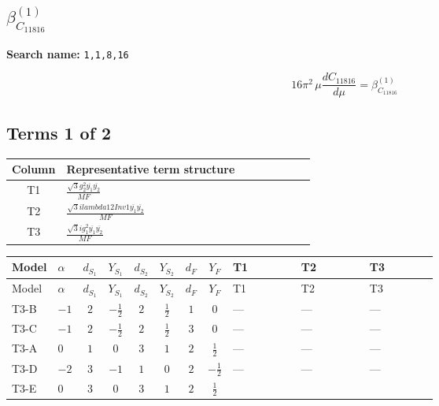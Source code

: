 \documentclass[8pt]{article}
\begin{document}
\begin{landscape}
\section*{$\beta_{C_{11816}}^{(1)}$}
\noindent\textbf{Search name: }\texttt{1,1,8,16}\par\smallskip
\[16\pi^2\,\mu\frac{d C_{11816}}{d\mu}=\beta_{C_{11816}}^{(1)}\]
\subsection*{Terms 1 of 2}
\begin{center}
\begin{tabular}{@{}c >{\raggedright\arraybackslash}p{0.82\linewidth}@{}}
\toprule
Column & Representative term structure \\
\midrule
T1 & \(\displaystyle \frac{\sqrt{3} g_{2}^{2} \overline{y_{1}} \overline{y_{2}}}{MF}\) \\
\midrule
T2 & \(\displaystyle \frac{\sqrt{3} i lambda12Inv1 \overline{y_{1}} \overline{y_{2}}}{MF}\) \\
\midrule
T3 & \(\displaystyle \frac{\sqrt{3} i g_{1}^{2} \overline{y_{1}} \overline{y_{2}}}{MF}\) \\
\midrule
\bottomrule
\end{tabular}
\end{center}
\smallskip
\tiny
\begin{longtable}{@{}llcccccc >{\raggedright\arraybackslash}p{0.21\linewidth} >{\raggedright\arraybackslash}p{0.21\linewidth} >{\raggedright\arraybackslash}p{0.21\linewidth}@{}}
\toprule
Model & $\alpha$ & $d_{S_1}$ & $Y_{S_1}$ & $d_{S_2}$ & $Y_{S_2}$ & $d_F$ & $Y_F$ & T1 & T2 & T3 \\
\midrule
\endfirsthead
\toprule
Model & $\alpha$ & $d_{S_1}$ & $Y_{S_1}$ & $d_{S_2}$ & $Y_{S_2}$ & $d_F$ & $Y_F$ & T1 & T2 & T3 \\
\midrule
\endhead
T3-B & $-1$ & $2$ & $-\frac{1}{2}$ & $2$ & $\frac{1}{2}$ & $1$ & $0$ & --- & --- & --- \\
\midrule
T3-C & $-1$ & $2$ & $-\frac{1}{2}$ & $2$ & $\frac{1}{2}$ & $3$ & $0$ & --- & --- & --- \\
\midrule
T3-A & $0$ & $1$ & $0$ & $3$ & $1$ & $2$ & $\frac{1}{2}$ & --- & --- & --- \\
\midrule
T3-D & $-2$ & $3$ & $-1$ & $1$ & $0$ & $2$ & $-\frac{1}{2}$ & --- & --- & --- \\
\midrule
T3-E & $0$ & $3$ & $0$ & $3$ & $1$ & $2$ & $\frac{1}{2}$ & \scriptsize\adjustbox{max width=\linewidth}{$\begin{gathered} \frac{\sqrt{3} g_{2}^{2} \overline{y_{1}} \overline{y_{2}}}{6 MF}\end{gathered}$} & \scriptsize\adjustbox{max width=\linewidth}{$\begin{gathered} - \frac{\sqrt{3} i lambda12Inv1 \overline{y_{1}} \overline{y_{2}}}{6 MF}\end{gathered}$} & \scriptsize\adjustbox{max width=\linewidth}{$\begin{gathered} \frac{\sqrt{3} i g_{1}^{2} \overline{y_{1}} \overline{y_{2}}}{8 MF}\end{gathered}$} \\

\end{longtable}
\end{landscape}
\end{document}
